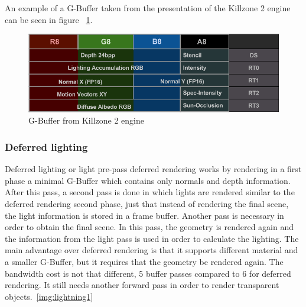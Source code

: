 An example of a G-Buffer taken from the presentation of the Killzone 2 engine can be seen in figure ~\ref{img:deferred1}.

\begin{center}
	\begin{figure}[here!]
		\includegraphics[width=\textwidth]{src/img/deferred1.png}
		\caption{G-Buffer from Killzone 2 engine}
		\label{img:deferred1}
	\end{figure}
\end{center}

\subsubsection{Deferred lighting}

Deferred lighting or light pre-pass deferred rendering works by rendering in a first phase a minimal G-Buffer which contains only normals and depth information. After this pass, a second pass is done in which lights are rendered similar to the deferred rendering second phase, just that instead of rendering the final scene, the light information is stored in a frame buffer. 
Another pass is necessary in order to obtain the final scene. In this pass, the geometry is rendered again and the information from the light pass is used in order to calculate the lighting.
The main advantage over deferred rendering is that it supports different material and a smaller G-Buffer, but it requires that the geometry be rendered again. The bandwidth cost is not that different, 5 buffer passes compared to 6 for deferred rendering.
It still needs another forward pass in order to render transparent objects.~\ref{img:lightning1}

